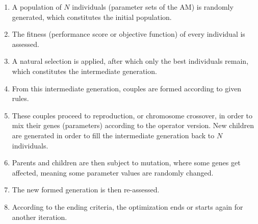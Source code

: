 \documentclass[twocol]{ametsoc}
\begin{document}
\begin{enumerate}
	\item A population of $N$ individuals (parameter sets of the AM) is randomly generated, which constitutes the initial population.
	\item The fitness (performance score or objective function) of every individual is assessed.
	\item A natural selection is applied, after which only the best individuals remain, which constitutes the intermediate generation.
	\item From this intermediate generation, couples are formed according to given rules.
	\item These couples proceed to reproduction, or chromosome crossover, in order to mix their genes (parameters) according to the operator version. New children are generated in order to fill the intermediate generation back to $N$ individuals.
	\item Parents and children are then subject to mutation, where some genes get affected, meaning some parameter values are randomly changed.
	\item The new formed generation is then re-assessed.
	\item According to the ending criteria, the optimization ends or starts again for another iteration.
\end{enumerate}
\end{document}
